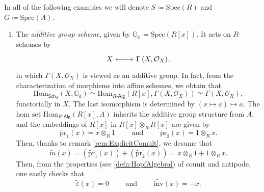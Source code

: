 \documentclass[../Main]{subfiles}
\begin{document}
\begin{ex}
	In all of the following examples we will denote $S \coloneqq \mathrm{Spec}(R)$
	and $G \coloneqq \mathrm{Spec}(A)$.\nopagebreak[4]
	\begin{enumerate}
		\item The {\em additive group scheme}, given by 
			$\mathbb{G}_a \coloneqq \mathrm{Spec}(R[x])$.
			It acts on $R$-schemes by
			\begin{equation}
			\begin{tikzcd}[row sep = 0ex
				,/tikz/column 1/.append style={anchor=base east}
				,/tikz/column 2/.append style={anchor=base west}]
				X \arrow[r, "", mapsto] & 
				\Gamma \left( X , \mathcal{O}_{ X } \right)
			,\end{tikzcd}
			\end{equation} 
			in which $\Gamma \left( X , \mathcal{O}_{ X } \right)$ is viewed
			as an additive group.
			In fact, from the characterization of morphisms into affine schemes,
			we obtain that
			\begin{equation}
			\mathrm{Hom}_{\mathsf{Sch}_S} \left( X, \mathbb{G}_a \right) \simeq
			\mathrm{Hom}_{R \text{-}\mathsf{Alg}} 
			\left( R[x], \Gamma \left( X , \mathcal{O}_{ X } \right) \right) \simeq
			\Gamma \left( X , \mathcal{O}_{ X } \right)
			,\end{equation} 
			functorially in $X$.
			The last isomorphism is determined by 
			$(x \mapsto a) \mapsto a$.
			The hom set 
			$\mathrm{Hom}_{R \text{-}\mathsf{Alg}} \left( R[x], A \right)$
			inherits the additive group structure from $A$, and the embeddings
			of $R[x]$ in $R[x] \otimes_R R[x]$ are given by
			\begin{equation}
				\widetilde{\mathrm{pr}}_1(x) = x \otimes_R 1
				\qquad \text{ and } \qquad
				\widetilde{\mathrm{pr}}_2(x) = 1 \otimes_R x
			.\end{equation} 
			Then, thanks to remark \ref{rem:ExplicitComult},
			we desume that
			\begin{equation}
				\widetilde{m}(x) =
				\left( \widetilde{\mathrm{pr}}_1(x) \right) +
				\left( \widetilde{\mathrm{pr}}_2(x) \right) =
				x \otimes_R 1 + 1 \otimes_R x
			.\end{equation} 
			Then, from the properties (see \ref{defn:HopfAlgebra})
			of counit and antipode, one easily checks that 
			\begin{equation}
				\widetilde{\varepsilon}(x) = 0
				\qquad \text{ and } \qquad
				\widetilde{\mathrm{inv}}(x) = -x
			.\end{equation} 



\end{enumerate}
\end{ex}
\end{document}

